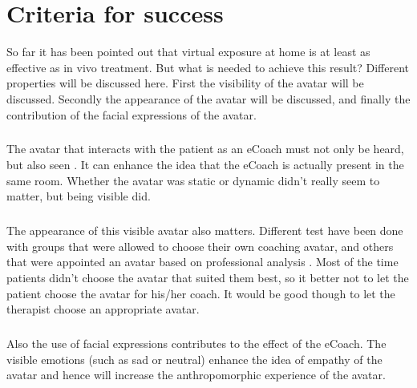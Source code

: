 \documentclass[english,a4paper,pdftex]{report}
\begin{document}
\chapter{Criteria for success}
So far it has been pointed out that virtual exposure at home is at least as effective as in vivo treatment. But what is needed to achieve this result? Different properties will be discussed here. First the visibility of the avatar will be discussed. Secondly the appearance of the avatar will be discussed, and finally the contribution of the facial expressions of the avatar.
\paragraph{}
The avatar that interacts with the patient as an eCoach must not only be heard, but also seen \cite{baylor2009promoting}. It can enhance the idea that the eCoach is actually present in the same room. Whether the avatar was static or dynamic didn't really seem to matter, but being visible did.
\paragraph{}
The appearance of this visible avatar also matters. Different test have been done with groups that were allowed to choose their own coaching avatar, and others that were appointed an avatar based on professional analysis \cite{baylor2009promoting}. Most of the time patients didn't choose the avatar that suited them best, so it better not to let the patient choose the avatar for his/her coach. It would be good though to let the therapist choose an appropriate avatar.
\paragraph{}
Also the use of facial expressions contributes to the effect of the eCoach. The visible emotions (such as sad or neutral) enhance the idea of empathy of the avatar \cite{blanson2009online} and hence will increase the anthropomorphic experience of the avatar.
\paragraph{}





\end{document}
